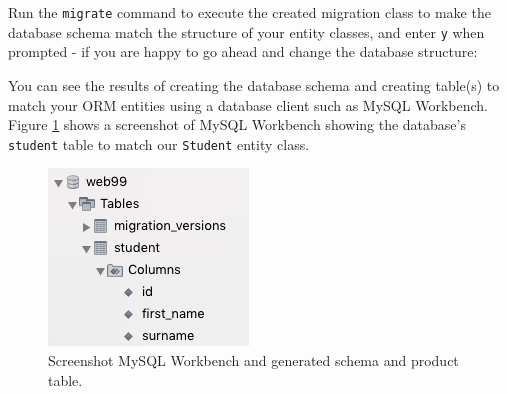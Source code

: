 \documentclass[a4paperpaper,openright]{book}
\newenvironment{Shaded}{}{}
\newcommand{\ExtensionTok}[1]{#1}
\newcommand{\NormalTok}[1]{#1}
\newcommand{\OperatorTok}[1]{\textcolor[rgb]{0.40,0.40,0.40}{#1}}
\begin{document}
Run the \texttt{migrate} command to execute the created migration class
to make the database schema match the structure of your entity classes,
and enter \texttt{y} when prompted - if you are happy to go ahead and
change the database structure:

\begin{Shaded}
\end{Shaded}

You can see the results of creating the database schema and creating
table(s) to match your ORM entities using a database client such as
MySQL Workbench. Figure \ref{db_schema} shows a screenshot of MySQL
Workbench showing the database's \texttt{student} table to match our
\texttt{Student} entity class.

\begin{figure}
\centering
\includegraphics{./tex2pdf.-8aed53dcd332a606/30c41e5c5578a73fe9d7d82f45da81b21af7455c.png}
\caption{Screenshot MySQL Workbench and generated schema and product
table. \label{db_schema}}
\end{figure}
\end{document}

